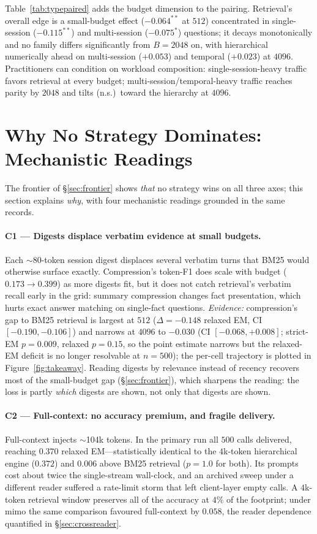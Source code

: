 \documentclass{article} %
\begin{document}
Table~\ref{tab:typepaired} adds the budget dimension to the pairing. Retrieval's overall
edge is a small-budget effect ($-0.064^{**}$ at $512$) concentrated in single-session
($-0.115^{**}$) and multi-session ($-0.075^{*}$) questions; it decays monotonically and no
family differs significantly from $B{=}2048$ on, with hierarchical numerically ahead on
multi-session ($+0.053$) and temporal ($+0.023$) at $4096$. Practitioners can condition on
workload composition: single-session-heavy traffic favors retrieval at every budget;
multi-session/temporal-heavy traffic reaches parity by $2048$ and tilts (n.s.)\ toward the
hierarchy at $4096$.

\section{Why No Strategy Dominates: Mechanistic Readings}
\label{sec:mechanism}
The frontier of \S\ref{sec:frontier} shows \emph{that} no strategy wins on all three
axes; this section explains \emph{why}, with four mechanistic readings grounded in the
same records.

\paragraph{C1 --- Digests displace verbatim evidence at small budgets.} Each
$\sim$80-token session digest displaces several verbatim turns that BM25 would otherwise
surface exactly. Compression's token-F1 does scale with budget ($0.173 \rightarrow
0.399$) as more digests fit, but it does not catch retrieval's verbatim recall early in
the grid: summary compression changes fact presentation, which hurts exact answer
matching on single-fact questions. \emph{Evidence:} compression's gap to BM25 retrieval is
largest at $512$ ($\Delta{=}-0.148$ relaxed EM, CI $[-0.190,-0.106]$) and narrows at $4096$ to
$-0.030$ (CI $[-0.068,+0.008]$; strict-EM $p{=}0.009$, relaxed $p{=}0.15$, so the point
estimate narrows but the relaxed-EM deficit is no longer resolvable at $n{=}500$); the per-cell
trajectory is plotted in Figure~\ref{fig:takeaway}. Reading digests by relevance instead of
recency recovers most of the small-budget gap (\S\ref{sec:frontier}), which sharpens the
reading: the loss is partly \emph{which} digests are shown, not only that digests are shown.

\paragraph{C2 --- Full-context: no accuracy premium, and fragile delivery.} Full-context
injects $\sim$104k tokens. In the primary run all $500$ calls delivered, reaching $0.370$
relaxed EM---statistically identical to the $4$k-token hierarchical engine ($0.372$) and
$0.006$ above BM25 retrieval ($p{=}1.0$ for both). Its prompts cost about twice the
single-stream wall-clock, and an archived sweep under a different reader suffered a rate-limit
storm that left client-layer empty calls. A $4$k-token retrieval window preserves all of the
accuracy at $4\%$ of the footprint; under mimo the same comparison favoured full-context by
$0.058$, the reader dependence quantified in \S\ref{sec:crossreader}.
\end{document}
